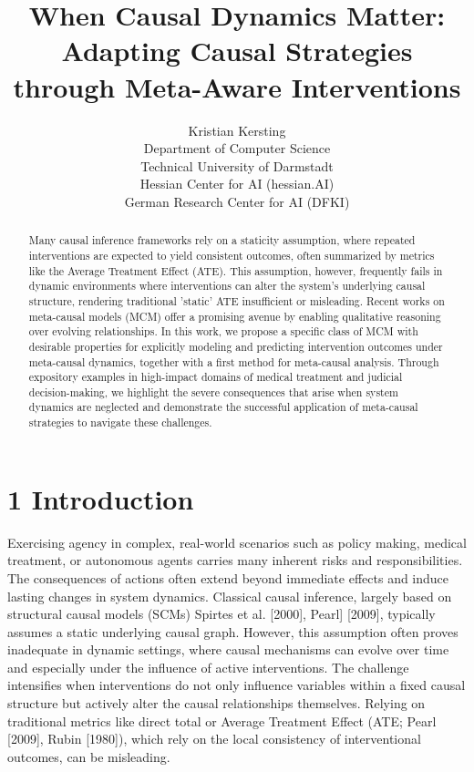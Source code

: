 \documentclass[10pt]{article}
\title{When Causal Dynamics Matter: Adapting Causal Strategies through Meta-Aware Interventions }
\author{Kristian Kersting\\
Department of Computer Science\\
Technical University of Darmstadt\\
Hessian Center for AI (hessian.AI)\\
German Research Center for AI (DFKI)}
\date{}
\begin{document}
\maketitle
\captionsetup{singlelinecheck=false}


\begin{abstract}
Many causal inference frameworks rely on a staticity assumption, where repeated interventions are expected to yield consistent outcomes, often summarized by metrics like the Average Treatment Effect (ATE). This assumption, however, frequently fails in dynamic environments where interventions can alter the system's underlying causal structure, rendering traditional 'static' ATE insufficient or misleading. Recent works on meta-causal models (MCM) offer a promising avenue by enabling qualitative reasoning over evolving relationships. In this work, we propose a specific class of MCM with desirable properties for explicitly modeling and predicting intervention outcomes under meta-causal dynamics, together with a first method for meta-causal analysis. Through expository examples in high-impact domains of medical treatment and judicial decision-making, we highlight the severe consequences that arise when system dynamics are neglected and demonstrate the successful application of meta-causal strategies to navigate these challenges.
\end{abstract}

\section*{1 Introduction}
Exercising agency in complex, real-world scenarios such as policy making, medical treatment, or autonomous agents carries many inherent risks and responsibilities. The consequences of actions often extend beyond immediate effects and induce lasting changes in system dynamics. Classical causal inference, largely based on structural causal models (SCMs) Spirtes et al. [2000], Pearl] [2009], typically assumes a static underlying causal graph. However, this assumption often proves inadequate in dynamic settings, where causal mechanisms can evolve over time and especially under the influence of active interventions. The challenge intensifies when interventions do not only influence variables within a fixed causal structure but actively alter the causal relationships themselves. Relying on traditional metrics like direct total or Average Treatment Effect (ATE; Pearl [2009], Rubin [1980]), which rely on the local consistency of interventional outcomes, can be misleading.
\end{document}
